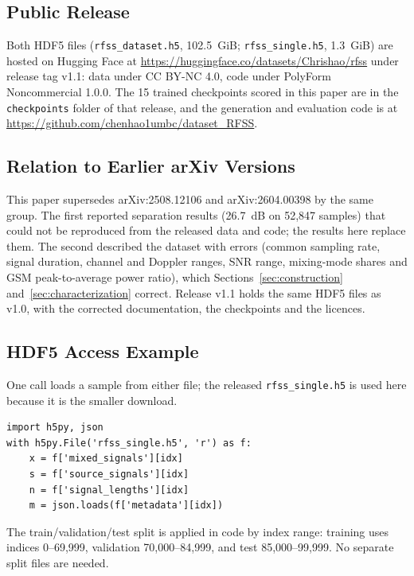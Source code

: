 \documentclass[journal]{IEEEtran}
\begin{document}
\subsection{Public Release}

Both HDF5 files (\texttt{rfss\_dataset.h5}, 102.5~GiB; \texttt{rfss\_single.h5},
1.3~GiB) are hosted on Hugging Face at
\url{https://huggingface.co/datasets/Chrishao/rfss} under release tag v1.1: data
under CC BY-NC 4.0, code under PolyForm Noncommercial 1.0.0. The 15 trained
checkpoints scored in this paper are in the \texttt{checkpoints} folder of that
release, and the generation and evaluation code is at
\url{https://github.com/chenhao1umbc/dataset_RFSS}.

\subsection{Relation to Earlier arXiv Versions}

This paper supersedes arXiv:2508.12106 and arXiv:2604.00398 by the same group.
The first reported separation results (26.7~dB on 52,847 samples) that could not
be reproduced from the released data and code; the results here replace them.
The second described the dataset with errors (common sampling rate, signal
duration, channel and Doppler ranges, SNR range, mixing-mode shares and GSM
peak-to-average power ratio), which Sections~\ref{sec:construction}
and~\ref{sec:characterization} correct. Release v1.1 holds the same HDF5 files as
v1.0, with the corrected documentation, the checkpoints and the licences.

\subsection{HDF5 Access Example}

One call loads a sample from either file; the released
\texttt{rfss\_single.h5} is used here because it is the smaller download.

\begin{verbatim}
import h5py, json
with h5py.File('rfss_single.h5', 'r') as f:
    x = f['mixed_signals'][idx]
    s = f['source_signals'][idx]
    n = f['signal_lengths'][idx]
    m = json.loads(f['metadata'][idx])
\end{verbatim}

The train/validation/test split is applied in code by index range:
training uses indices 0--69,999, validation 70,000--84,999, and test
85,000--99,999. No separate split files are needed.
\end{document}
